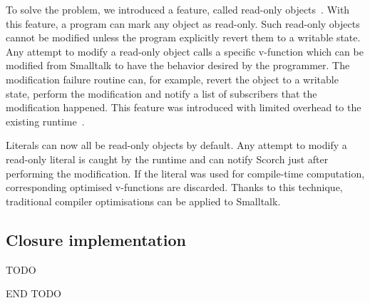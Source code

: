 \documentclass[a4paper,12pt,twoside]{../includes/ThesisStyle}
\begin{document}
To solve the problem, we introduced a feature, called read-only objects~\cite{Bera16b}. With this feature, a program can mark any object as read-only. Such read-only objects cannot be modified unless the program explicitly revert them to a writable state. Any attempt to modify a read-only object calls a specific v-function which can be modified from Smalltalk to have the behavior desired by the programmer. The modification failure routine can, for example, revert the object to a writable state, perform the modification and notify a list of subscribers that the modification happened. This feature was introduced with limited overhead to the existing runtime~\cite{Bera16b}. 

Literals can now all be read-only objects by default. Any attempt to modify a read-only literal is caught by the runtime and can notify Scorch just after performing the modification. If the literal was used for compile-time computation, corresponding optimised v-functions are discarded. Thanks to this technique, traditional compiler optimisations can be applied to Smalltalk.

\subsection{Closure implementation}

TODO



END TODO


\ifx\wholebook\relax\else
    
\end{document}
